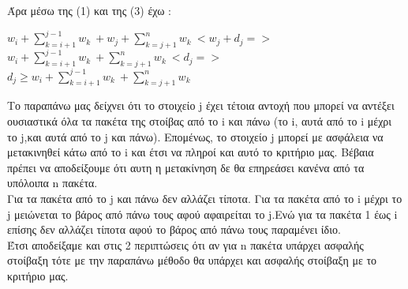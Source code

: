 \documentclass[12pt,a4paper]{article}
\begin{document}
Άρα μέσω της (1) και της (3) έχω :
\begin{center}
$ w_i + \sum_{k=i+1}^{j-1} w_k \ + w_j + \sum_{k=j+1}^{n} w_k \ < w_j + d_j =>$ \\
$ w_i + \sum_{k=i+1}^{j-1} w_k \ + \sum_{k=j+1}^{n} w_k \ < d_j =>$
\\
$d_j \ge w_i + \sum_{k=i+1}^{j-1} w_k \ + \sum_{k=j+1}^{n} w_k$
\end{center}
Το παραπάνω μας δείχνει ότι το στοιχείο j έχει τέτοια αντοχή που μπορεί να αντέξει ουσιαστικά όλα τα πακέτα της στοίβας από το i και πάνω (το i, αυτά από το i μέχρι το j,και αυτά από το j και πάνω). Επομένως, το στοιχείο j μπορεί με ασφάλεια να μετακινηθεί κάτω από το i και έτσι να πληροί και αυτό το κριτήριο μας. Βέβαια πρέπει να αποδείξουμε ότι αυτη η μετακίνηση δε θα επηρεάσει κανένα από τα υπόλοιπα n πακέτα. \\
Για τα πακέτα από το j και πάνω δεν αλλάζει τίποτα. Για τα πακέτα από το i μέχρι το j μειώνεται το βάρος από πάνω τους αφού αφαιρείται το j.Ενώ για τα πακέτα 1 έως i επίσης δεν αλλάζει τίποτα αφού το βάρος από πάνω τους παραμένει ίδιο.\\
Έτσι αποδείξαμε και στις 2 περιπτώσεις ότι αν για n πακέτα υπάρχει ασφαλής στοίβαξη τότε με την παραπάνω μέθοδο θα υπάρχει και ασφαλής στοίβαξη με το κριτήριο μας.\\
\end{document}
